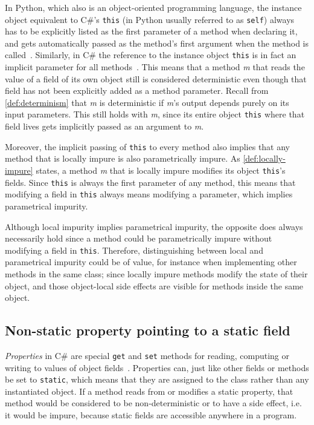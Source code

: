 \documentclass[a4paper,12pt]{article}
\begin{document}
In Python, which also is an object-oriented programming language, the instance object equivalent to C\#'s \texttt{this} (in Python usually referred to as \texttt{self}) always has to be explicitly listed as the first parameter of a method when declaring it, and gets automatically passed as the method's first argument when the method is called~\cite{python-classes}. Similarly, in C\# the reference to the instance object \texttt{this} is in fact an implicit parameter for all methods~\cite{michaelis2018essential}. This means that a method \textit{m} that reads the value of a field of its own object still is considered deterministic even though that field has not been explicitly added as a method parameter. Recall from \autoref{def:determinism} that \textit{m} is deterministic if \textit{m}'s output depends purely on its input parameters. This still holds with \textit{m}, since its entire object \texttt{this} where that field lives gets implicitly passed as an argument to \textit{m}.

Moreover, the implicit passing of \texttt{this} to every method also implies that any method that is locally impure is also parametrically impure. As \autoref{def:locally-impure} states, a method \textit{m} that is locally impure modifies its object \texttt{this}'s fields. Since \texttt{this} is always the first parameter of any method, this means that modifying a field in \texttt{this} always means modifying a parameter, which implies parametrical impurity.

Although local impurity implies parametrical impurity, the opposite does always necessarily hold since a method could be parametrically impure without modifying a field in \texttt{this}. Therefore, distinguishing between local and parametrical impurity could be of value, for instance when implementing other methods in the same class; since locally impure methods modify the state of their object, and those object-local side effects are visible for methods inside the same object.

\subsection{Non-static property pointing to a static field} \label{sub:non-static-property}

\textit{Properties} in C\# are special \texttt{get} and \texttt{set} methods for reading, computing or writing to values of object fields~\cite{microsoft-properties}. Properties can, just like other fields or methods be set to \texttt{static}, which means that they are assigned to the class rather than any instantiated object. If a method reads from or modifies a static property, that method would be considered to be non-deterministic or to have a side effect, i.e. it would be impure, because static fields are accessible anywhere in a program.
\end{document}
